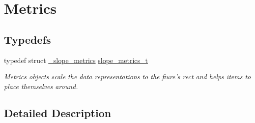 \hypertarget{group__Metrics}{\section{Metrics}
\label{group__Metrics}
}
\subsection*{Typedefs}
\begin{DoxyCompactItemize}
\item 
\hypertarget{group__Metrics_gab80787ee8ae8dc449e770249fe0e3c35}{typedef struct \hyperlink{struct__slope__metrics}{\+\_\+slope\+\_\+metrics} \hyperlink{group__Metrics_gab80787ee8ae8dc449e770249fe0e3c35}{slope\+\_\+metrics\+\_\+t}}\label{group__Metrics_gab80787ee8ae8dc449e770249fe0e3c35}

\begin{DoxyCompactList}\small\item\em Metrics objects scale the data representations to the fiure's rect and helps items to place themselves around. \end{DoxyCompactList}\end{DoxyCompactItemize}


\subsection{Detailed Description}
